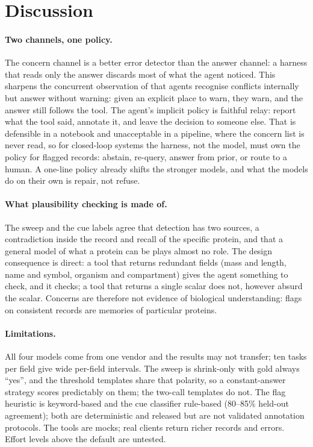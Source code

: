 \documentclass{article}
\begin{document}
\section{Discussion}
\paragraph{Two channels, one policy.} The concern channel is a better error detector than the answer channel: a harness that reads only the answer discards most of what the agent noticed. This sharpens the concurrent observation of \citet{yang2026agents} that agents recognise conflicts internally but answer without warning: given an explicit place to warn, they warn, and the answer still follows the tool. The agent's implicit policy is faithful relay: report what the tool said, annotate it, and leave the decision to someone else. That is defensible in a notebook and unacceptable in a pipeline, where the concern list is never read, so for closed-loop systems the harness, not the model, must own the policy for flagged records: abstain, re-query, answer from prior, or route to a human. A one-line policy already shifts the stronger models, and what the models do on their own is repair, not refuse.

\paragraph{What plausibility checking is made of.} The sweep and the cue labels agree that detection has two sources, a contradiction inside the record and recall of the specific protein, and that a general model of what a protein can be plays almost no role. The design consequence is direct: a tool that returns redundant fields (mass and length, name and symbol, organism and compartment) gives the agent something to check, and it checks; a tool that returns a single scalar does not, however absurd the scalar. Concerns are therefore not evidence of biological understanding: flags on consistent records are memories of particular proteins.

\paragraph{Limitations.} All four models come from one vendor and the results may not transfer; ten tasks per field give wide per-field intervals. The sweep is shrink-only with gold always ``yes'', and the threshold templates share that polarity, so a constant-answer strategy scores predictably on them; the two-call templates do not. The flag heuristic is keyword-based and the cue classifier rule-based (80--85\% held-out agreement); both are deterministic and released but are not validated annotation protocols. The tools are mocks; real clients return richer records and errors. Effort levels above the default are untested.
\end{document}

